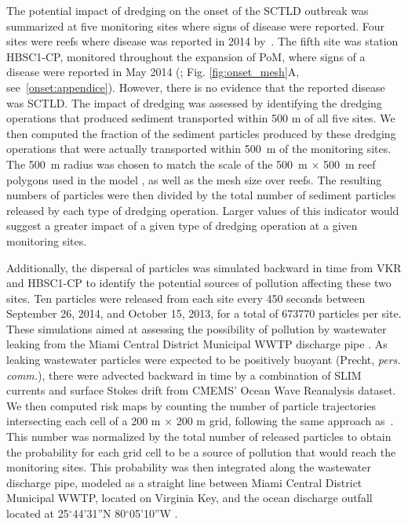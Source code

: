 \documentclass[preprint,12pt,authoryear]{elsarticle}
\begin{document}
The potential impact of dredging on the onset of the SCTLD outbreak was summarized at five monitoring sites where signs of disease were reported. Four sites were reefs where disease was reported in 2014 by~\cite{precht2016unprecedented}. The fifth site was station HBSC1-CP, monitored throughout the expansion of PoM, where signs of a disease were reported in May 2014 (\citealp{dial2017}; Fig. \ref{fig:onset_mesh}A, see~\ref{onset:appendice}). However, there is no evidence that the reported disease was SCTLD. The impact of dredging was assessed by identifying the dredging operations that produced sediment transported within 500 m of all five sites. We then computed the fraction of the sediment particles produced by these dredging operations that were actually transported within 500~m of the monitoring sites. The 500~m radius was chosen to match the scale of the 500~m $\times$ 500~m reef polygons used in the model \citep{dobbelaere2020coupled}, as well as the mesh size over reefs. The resulting numbers of particles were then divided by the total number of sediment particles released by each type of dredging operation. Larger values of this indicator would suggest a greater impact of a given type of dredging operation at a given monitoring sites.

Additionally, the dispersal of particles was simulated backward in time from VKR and HBSC1-CP to identify the potential sources of pollution affecting these two sites. Ten particles were released from each site every 450 seconds between September 26, 2014, and October 15, 2013, for a total of 673770 particles per site. These simulations aimed at assessing the possibility of pollution by wastewater leaking from the Miami Central District Municipal WWTP discharge pipe \citep{gintert2019regional}. As leaking wastewater particles were expected to be positively buoyant (Precht, \textit{pers. comm.}), there were advected backward in time by a combination of SLIM currents and surface Stokes drift from CMEMS' Ocean Wave Reanalysis dataset. We then computed risk maps by counting the number of particle trajectories intersecting each cell of a 200 m $\times$ 200 m grid, following the same approach as~\cite{anselain2023qatar}. This number was normalized by the total number of released particles to obtain the probability for each grid cell to be a source of pollution that would reach the monitoring sites.
This probability was then integrated along the wastewater discharge pipe, modeled as a straight line between Miami Central District Municipal WWTP, located on Virginia Key, and the ocean discharge outfall located at 25$^\circ$44'31''N 80$^\circ$05'10''W \citep{koopman2006ocean}.
\end{document}
